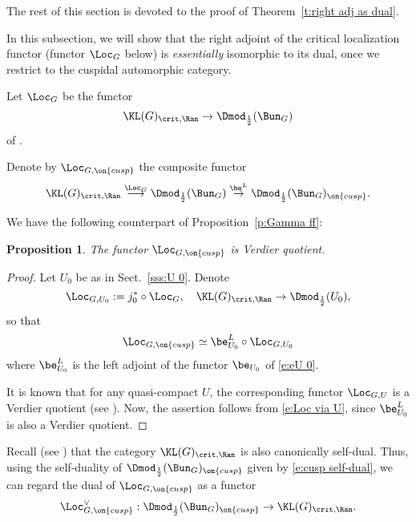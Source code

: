 \documentclass[9pt]{amsart}
\newtheorem{prop}[subsubsection]{Proposition}
\theoremstyle{remark}
\theoremstyle{definition}
\theoremstyle{remark}
\newcommand{\thmref}[1]{Theorem~\ref{#1}}
\newcommand{\secref}[1]{Sect.~\ref{#1}}
\newcommand{\propref}[1]{Proposition~\ref{#1}}
\numberwithin{equation}{section}
\begin{document}
\sssec{}

The rest of this section is devoted to the proof of \thmref{t:right adj as dual}.



In this subsection, we will show that the right adjoint of the critical localization functor (functor $\Loc_G$ below)
is \emph{essentially} isomorphic to its dual, once we restrict to the cuspidal automorphic category. 

\sssec{}

Let $\Loc_G$ be the functor
$$\KL(G)_{\crit,\Ran}\to \Dmod_{\frac{1}{2}}(\Bun_G)$$
of \cite[Sect. 14.1.4]{GLC2}.

\sssec{}

Denote by $\Loc_{G,\on{cusp}}$ the composite functor
$$\KL(G)_{\crit,\Ran} \overset{\Loc_G}\longrightarrow \Dmod_{\frac{1}{2}}(\Bun_G)\overset{\be^L}\to \Dmod_{\frac{1}{2}}(\Bun_G)_{\on{cusp}}.$$

We have the following counterpart of \propref{p:Gamma ff}:

\begin{prop} \label{p:Loc crit is Loc}
The functor $\Loc_{G,\on{cusp}}$ is Verdier quotient.
\end{prop}

\begin{proof}

Let $U_0$ be as in \secref{sss:U 0}. Denote 
$$\Loc_{G,U_0}:=j_0^*\circ \Loc_G, \quad \KL(G)_{\crit,\Ran}\to \Dmod_{\frac{1}{2}}(U_0),$$
so that
\begin{equation} \label{e:Loc via U}
\Loc_{G,\on{cusp}}\simeq \be_{U_0}^L\circ \Loc_{G,U_0}
\end{equation} 
where $\be^L_{U_0}$ is the left adjoint of the functor $\be_{U_0}$ of \eqref{e:eU 0}. 

\medskip

It is known that for any quasi-compact $U$, the corresponding functor $\Loc_{G,U}$ is a Verdier quotient
(see \cite[Theorem 13.4.2]{GLC2}). Now, the assertion follows from \eqref{e:Loc via U}, since $\be_{U_0}^L$ is also a Verdier quotient.

\end{proof}

\sssec{}

Recall (see \cite[Sect. 2.2.4]{GLC2}) that the category $\KL(G)_{\crit,\Ran}$ is also canonically self-dual.
Thus, using the self-duality of $\Dmod_{\frac{1}{2}}(\Bun_G)_{\on{cusp}}$ given by \eqref{e:cusp self-dual},
we can regard the dual of $\Loc_{G,\on{cusp}}$ as a functor 
\begin{equation}
\Loc_{G,\on{cusp}}^\vee:\Dmod_{\frac{1}{2}}(\Bun_G)_{\on{cusp}}\to \KL(G)_{\crit,\Ran}.
\end{equation}
\end{document}
